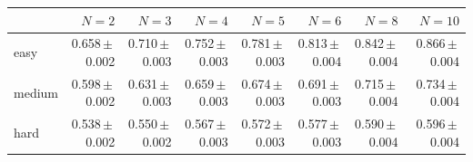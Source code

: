 \begin{tabular}{lrrrrrrr}
\toprule
 & $N{=}2$ & $N{=}3$ & $N{=}4$ & $N{=}5$ & $N{=}6$ & $N{=}8$ & $N{=}10$ \\
\midrule
easy & 0.658\,$\pm$\,0.002 & 0.710\,$\pm$\,0.003 & 0.752\,$\pm$\,0.003 & 0.781\,$\pm$\,0.003 & 0.813\,$\pm$\,0.004 & 0.842\,$\pm$\,0.004 & 0.866\,$\pm$\,0.004 \\
medium & 0.598\,$\pm$\,0.002 & 0.631\,$\pm$\,0.003 & 0.659\,$\pm$\,0.003 & 0.674\,$\pm$\,0.003 & 0.691\,$\pm$\,0.003 & 0.715\,$\pm$\,0.004 & 0.734\,$\pm$\,0.004 \\
hard & 0.538\,$\pm$\,0.002 & 0.550\,$\pm$\,0.002 & 0.567\,$\pm$\,0.003 & 0.572\,$\pm$\,0.003 & 0.577\,$\pm$\,0.003 & 0.590\,$\pm$\,0.004 & 0.596\,$\pm$\,0.004 \\
\bottomrule
\end{tabular}
